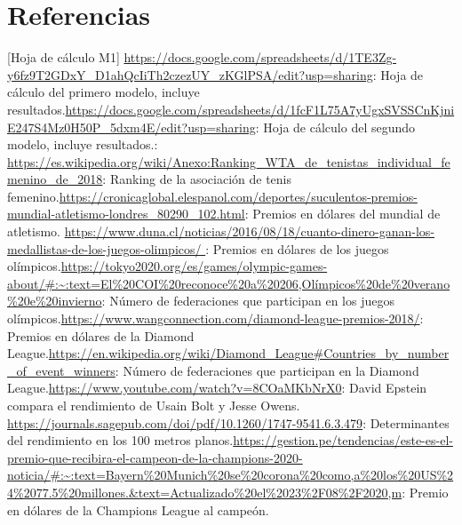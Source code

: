\documentclass[a4paper]{article}
\begin{document}
\section{Referencias}
[Hoja de cálculo M1] \url{https://docs.google.com/spreadsheets/d/1TE3Zg-y6fz9T2GDxY_D1ahQcIiTh2czezUY_zKGlPSA/edit?usp=sharing}: Hoja de cálculo del primero modelo, incluye resultados.\newline{}
\url{https://docs.google.com/spreadsheets/d/1fcF1L75A7yUgxSVSSCnKjniE247S4Mz0H50P_5dxm4E/edit?usp=sharing}: Hoja de cálculo del segundo modelo, incluye resultados.\newline\newline [WTA]: \url{https://es.wikipedia.org/wiki/Anexo:Ranking_WTA_de_tenistas_individual_femenino_de_2018}: Ranking de la asociación de tenis femenino.\newline\newline [CG] \url{https://cronicaglobal.elespanol.com/deportes/suculentos-premios-mundial-atletismo-londres_80290_102.html}: Premios en dólares del mundial de atletismo.
\newline\newline [D] \url{https://www.duna.cl/noticias/2016/08/18/cuanto-dinero-ganan-los-medallistas-de-los-juegos-olimpicos/ } : Premios en dólares de los juegos olímpicos.\newline\newline [T] \url{https://tokyo2020.org/es/games/olympic-games-about/#:~:text=El\%20COI\%20reconoce\%20a\%20206,Olímpicos\%20de\%20verano\%20e\%20invierno}: Número de federaciones que participan en los juegos olímpicos.\newline\newline
[WC] \url{https://www.wangconnection.com/diamond-league-premios-2018/}: Premios en dólares de la Diamond League.\newline\newline [DL] \url{https://en.wikipedia.org/wiki/Diamond_League#Countries_by_number_of_event_winners}: Número de federaciones que participan en la Diamond League.\newline\newline [DE] \url{https://www.youtube.com/watch?v=8COaMKbNrX0}: David Epstein compara el rendimiento de Usain Bolt y Jesse Owens.\newline\newline [SS] \url{ https://journals.sagepub.com/doi/pdf/10.1260/1747-9541.6.3.479}: Determinantes del rendimiento en los 100 metros planos.\newline\newline [G] \url{https://gestion.pe/tendencias/este-es-el-premio-que-recibira-el-campeon-de-la-champions-2020-noticia/#:~:text=Bayern\%20Munich\%20se\%20corona\%20como,a\%20los\%20US\%24\%2077.5\%20millones.&text=Actualizado\%20el\%2023\%2F08\%2F2020,m}: Premio en dólares de la Champions League al campeón.\newline\newline  
\end{document}
